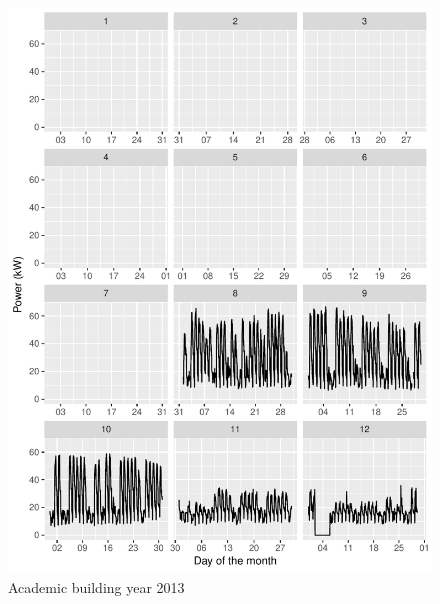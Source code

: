 \documentclass[11pt, oneside]{article}   	%
\begin{document}
\begin{figure}
\includegraphics[keepaspectratio]{acad_build_Y2013.pdf}
\caption{Academic building year 2013 }
\end{figure}
\end{document}
